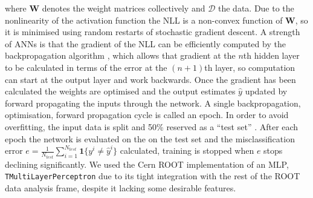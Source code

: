 where \textbf{W} denotes the weight matrices collectively and $\mathcal{D}$ the data.
Due to the nonlinearity of the activation function the NLL is a non-convex function of \textbf{W}, so it is minimised using random restarts of stochastic gradient descent. 
A strength of ANNs is that the gradient of the NLL can be efficiently computed by the backpropagation algorithm \cite{murphy2012machine}, which allows that gradient at the $n$th hidden layer to be calculated in terms of the error at the $(n+1)$th layer, so computation can start at the output layer and work backwards.
Once the gradient has been calculated the weights are optimised and the output estimates $\hat{y}$ updated by forward propagating the inputs through the network. A single backpropagation, optimisation, forward propagation cycle is called an epoch.
In order to avoid overfitting, the input data is split and 50\% reserved as a ``test set'' . 
After each epoch the network is evaluated on the on the test set and the misclassification error 
$e = \frac{1}{N_{test}}\sum_{i = 1}^{N_{test}} \mathbf{1}\{y^i \ne \hat{y}^i \} $
calculated, training is stopped when $e$ stops declining significantly.
We used the Cern ROOT \cite{citeulike:363715} implementation of an MLP, \texttt{TMultiLayerPerceptron} due to its tight integration with the rest of the ROOT data analysis frame, despite it lacking some desirable features.
